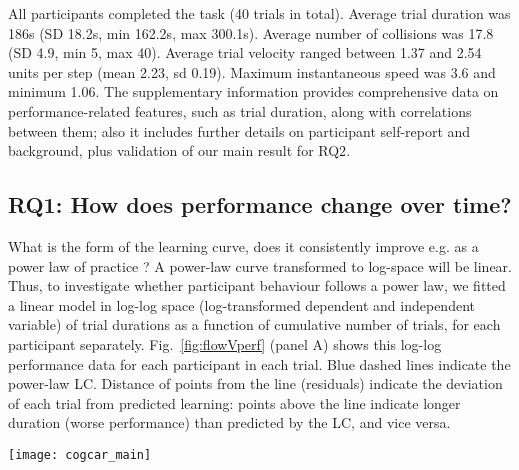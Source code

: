 
All participants completed the task (40 trials in total). Average trial duration was 186s (SD 18.2s, min 162.2s, max 300.1s). Average number of collisions was 17.8 (SD 4.9, min 5, max 40). Average trial velocity ranged between 1.37 and 2.54 units per step (mean 2.23, sd 0.19). Maximum instantaneous speed was 3.6 and minimum 1.06. The supplementary information provides comprehensive data on performance-related features, such as trial duration, along with correlations between them; also it includes further details on participant self-report and background, plus validation of our main result for {\sf RQ2}.


\subsection*{RQ1: How does performance change over time?}

What is the form of the learning curve, does it consistently improve e.g. as a power law of practice \citep{Newell1982}? A power-law curve transformed to log-space will be linear. Thus, to investigate whether participant behaviour follows a power law, we fitted a linear model in log-log space (log-transformed dependent and independent variable) of trial durations as a function of cumulative number of trials, for each participant separately. Fig.~\ref{fig:flowVperf} (panel A) shows this log-log performance data for each participant in each trial. Blue dashed lines indicate the power-law LC. Distance of points from the line (residuals) indicate the deviation of each trial from predicted learning: points above the line indicate longer duration (worse performance) than predicted by the LC, and vice versa.

\begin{figure*}[!p]
	\centering
	\texttt{[image: cogcar\_main]}
	\caption{{\it Panel A}: Participant-wise data showing logarithm-transformed performance and Flow self-reports in the speeded steering task. Ordinate shows log-duration of trials, abscissa shows log-cumulative trial count. Dashed blue lines fitted to the data are power-law learning curves, which transform to linear in log-log space. 95 \% confidence intervals around the slope are greyed.\\
  {\it Panel B}: Participant-wise deviation scores (observed trial duration minus predicted trial duration) plotted against Flow scores for each participant, and fitted by linear models. 95 \% confidence intervals around the slope are greyed.}
	\label{fig:flowVperf}
\end{figure*}

